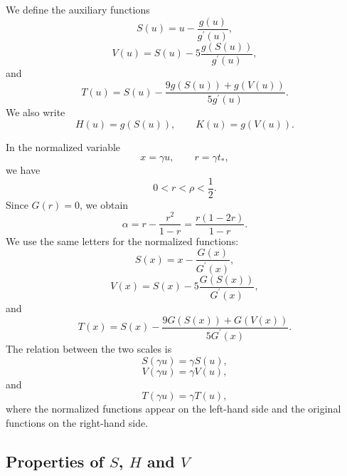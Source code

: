 \documentclass[11pt,a4paper]{article}
\numberwithin{equation}{section}
\numberwithin{table}{section}
\theoremstyle{plain}
\theoremstyle{definition}\newtheorem{definition}[theorem]{Definition}
\theoremstyle{remark}\newtheorem{remark}[theorem]{Remark}
\begin{document}
We define the auxiliary functions 
\begin{equation*}
S(u)=u-\frac{g(u)}{g^{\prime}(u)},
\end{equation*}
\begin{equation*}
V(u)=S(u)-5\frac{g(S(u))}{g^{\prime}(u)},
\end{equation*}
and 
\begin{equation*}
T(u)=S(u)-\frac{9g(S(u))+g(V(u))}{5g^{\prime}(u)}.
\end{equation*}
We also write 
\begin{equation*}
H(u)=g(S(u)), \qquad K(u)=g(V(u)).
\end{equation*}

In the normalized variable 
\begin{equation*}
x=\gamma u, \qquad r=\gamma t_*,
\end{equation*}
we have 
\begin{equation*}
0<r<\rho<\frac12.
\end{equation*}
Since $G(r)=0$, we obtain 
\begin{equation*}
\alpha=r-\frac{r^2}{1-r}=\frac{r(1-2r)}{1-r}.
\end{equation*}
We use the same letters for the normalized functions: 
\begin{equation*}
S(x)=x-\frac{G(x)}{G^{\prime}(x)},
\end{equation*}
\begin{equation*}
V(x)=S(x)-5\frac{G(S(x))}{G^{\prime}(x)},
\end{equation*}
and 
\begin{equation*}
T(x)=S(x)-\frac{9G(S(x))+G(V(x))}{5G^{\prime}(x)}.
\end{equation*}
The relation between the two scales is 
\begin{equation*}
S(\gamma u)=\gamma S(u),
\end{equation*}
\begin{equation*}
V(\gamma u)=\gamma V(u),
\end{equation*}
and 
\begin{equation*}
T(\gamma u)=\gamma T(u),
\end{equation*}
where the normalized functions appear on the left-hand side and the
original functions on the right-hand side.

\subsection{Properties of \texorpdfstring{$S$, $H$ and $V$}{S, H and V}}
\end{document}
